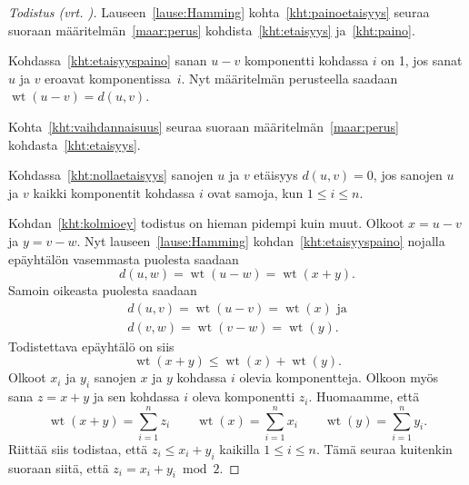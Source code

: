 \documentclass[a4paper,12pt,leqno,oneside]{report} %
\theoremstyle{plain}
\theoremstyle{plain}
\theoremstyle{definition}
\DeclareMathOperator{\wt}{wt}
\theoremstyle{remark}
\numberwithin{equation}{chapter}
\begin{document}
    \begin{proof}[Todistus \upshape(vrt. {\cite[s.~492]{PA}})]\label{tod: Hamming}
        Lauseen~\ref{lause:Hamming} kohta~\ref{kht:painoetaisyys} seuraa suoraan määritelmän~\ref{maar:perus} kohdista~\ref{kht:etaisyys} ja~\ref{kht:paino}.

        Kohdassa~\ref{kht:etaisyyspaino} sanan $u - v$ komponentti kohdassa $i$ on 1, jos sanat $u$ ja $v$ eroavat komponentissa~$i$. Nyt määritelmän perusteella saadaan $\wt(u - v) = d(u, v)$.

        Kohta~\ref{kht:vaihdannaisuus} seuraa suoraan määritelmän~\ref{maar:perus} kohdasta~\ref{kht:etaisyys}.

        Kohdassa~\ref{kht:nollaetaisyys} sanojen $u$ ja $v$ etäisyys $d(u, v) = 0$, jos sanojen $u$ ja $v$ kaikki komponentit kohdassa $i$ ovat samoja, kun $1 \le i \le n$.

        Kohdan~\ref{kht:kolmioey} todistus on hieman pidempi kuin muut. Olkoot $x = u - v$ ja $y = v - w$. Nyt lauseen~\ref{lause:Hamming} kohdan~\ref{kht:etaisyyspaino} nojalla epäyhtälön vasemmasta puolesta saadaan
        \[
            d(u,w) = \wt(u - w) = \wt(x + y).
        \]
        Samoin oikeasta puolesta saadaan
        \begin{gather*}
            d(u,v) = \wt(u - v) = \wt(x)\text{~ja} \\
            d(v,w) = \wt(v - w) = \wt(y).
        \end{gather*}
        Todistettava epäyhtälö on siis
        \[
            \wt(x + y) \le \wt(x) + \wt(y).
        \]
        Olkoot $x_i$ ja $y_i$ sanojen $x$ ja $y$ kohdassa $i$ olevia komponentteja. Olkoon myös sana $z = x + y$ ja sen kohdassa $i$ oleva komponentti $z_i$. Huomaamme, että
        \[
            \wt(x + y) = \sum_{i = 1}^n z_i \qquad \wt(x) = \sum_{i =1}^n x_i \qquad \wt(y) = \sum_{i = 1}^n y_i.
        \]
        Riittää siis todistaa, että $z_i \le x_i + y_i$ kaikilla $1 \le i \le n$. Tämä seuraa kuitenkin suoraan siitä, että $z_i = x_i + y_i \bmod 2$.
    \end{proof}
\end{document}
